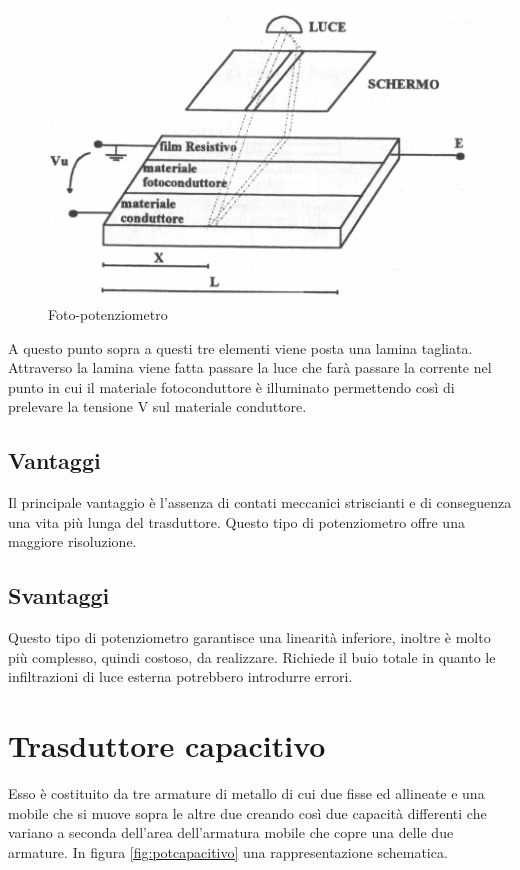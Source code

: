 \begin{figure}[htbp]
	\centering
	\includegraphics[scale=0.5]{img/fotopotenziometro.png}
	\caption{Foto-potenziometro\label{fig:fotopotenziometro}}
\end{figure}

A questo punto sopra a questi tre elementi viene posta una lamina
tagliata. Attraverso la lamina viene fatta passare la luce che farà
passare la corrente nel punto in cui il materiale fotoconduttore è
illuminato permettendo così di prelevare la tensione V sul materiale
conduttore.

\subsection{Vantaggi}
Il principale vantaggio è l'assenza di contati meccanici striscianti
e di conseguenza una vita più lunga del trasduttore. Questo tipo di
potenziometro offre una maggiore risoluzione.
\subsection{Svantaggi}
Questo tipo di potenziometro garantisce una linearità inferiore,
inoltre è molto più complesso, quindi costoso, da realizzare.
Richiede il buio totale in quanto le infiltrazioni di luce esterna
potrebbero introdurre errori.

\section{Trasduttore capacitivo}\label{sec:potcapacitivo}
Esso è costituito da tre armature di metallo di cui due fisse ed
allineate e una mobile che si muove sopra le altre due creando così
due capacità differenti che variano a seconda dell'area dell'armatura
mobile che copre una delle due armature. In figura
\ref{fig:potcapacitivo} una rappresentazione schematica.

